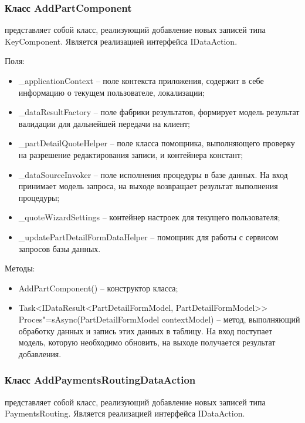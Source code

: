 \subsubsection{Класс AddPartComponent }
\label{sub:arch_and_mod:data_layer:add_part_component}

представляет собой класс, реализующий добавление новых записей типа KeyComponent. Является реализацией интерфейса IDataAction.

Поля:
\begin{itemize}
  \item \_applicationContext – поле контекста приложения, содержит в себе информацию о текущем пользователе, локализации;
  \item \_dataResultFactory – поле фабрики результатов, формирует модель результат валидации для дальнейшей передачи на клиент;
  \item \_partDetailQuoteHelper – поле класса помощника, выполняющего проверку на разрешение редактирования записи, и контейнера констант;
  \item \_dataSourceInvoker – поле исполнения процедуры в базе данных. На вход принимает модель запроса, на выходе возвращает результат выполнения процедуры;
  \item \_quoteWizardSettings – контейнер настроек для текущего пользователя;
  \item \_updatePartDetailFormDataHelper – помощник для работы с сервисом запросов базы данных.
\end{itemize}

Методы:
\begin{itemize}
  \item AddPartComponent() – конструктор класса;
  \item Task<IDataResult<PartDetailFormModel, PartDetailFormModel>> Proces"=sAsync(PartDetailFormModel contextModel) – метод, выполняющий обработку данных и запись этих данных в таблицу. На вход поступает модель, которую необходимо обновить, на выходе получается результат добавления.
\end{itemize}

\subsubsection{Класс AddPaymentsRoutingDataAction }
\label{sub:arch_and_mod:data_layer:add_payments_routing}

представляет собой класс, реализующий добавление новых записей типа PaymentsRouting. Является реализацией интерфейса IDataAction.

